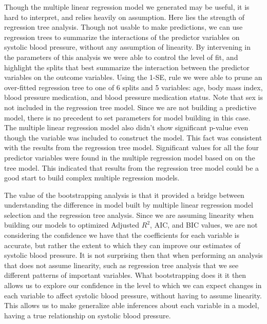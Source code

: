 \documentclass{article}\usepackage[]{graphicx}\usepackage[]{color}
\begin{document}
Though the multiple linear regression model we generated may be useful, it is hard to interpret, and relies heavily on assumption.  Here lies the strength of regression tree analysis.  Though not usable to make predictions, we can use regression trees to summarize the interactions of the predictor variables on systolic blood pressure, without any assumption of linearity.  By intervening in the parameters of this analysis we were able to control the level of fit, and highlight the splits that best summarize the interaction between the predictor variables on the outcome variables.  Using the 1-SE, rule  we were able to prune an over-fitted regression tree to one of 6 splits and 5 variables: age, body mass index, blood pressure medication, and blood pressure medication status. Note that sex is not included in the regression tree model. Since we are not building a predictive model, there is no precedent to set parameters for model building in this case. The multiple linear regression model also didn't show significant p-value even though the variable was included to construct the model. This fact was consistent with the results from the regression tree model. Significant values for all the four predictor variables were found in the multiple regression model based on on the tree model. This indicated that results from the regression tree model could be a good start to build complex multiple regression models. 

The value of the bootstrapping analysis is that it provided a bridge between understanding the difference in model built by multiple linear regression model selection and the regression tree analysis.  Since we are assuming linearity when building our models to optimized  Adjusted $R^2$, AIC, and BIC values, we are not considering the confidence we have that the coefficients for each variable is accurate, but rather the extent to which they can improve our estimates of systolic blood pressure.  It is not surprising then that when performing an analysis that does not assume linearity, such as regression tree analysis that we see different patterns of important variables.  What bootstrapping does it it then allows us to explore our confidence in the level to which we can expect changes in each variable to affect systolic blood pressure, without having to assume linearity.  This allows us to make generalize able inferences about each variable in a model, having a true relationship on systolic blood pressure.
\end{document}

